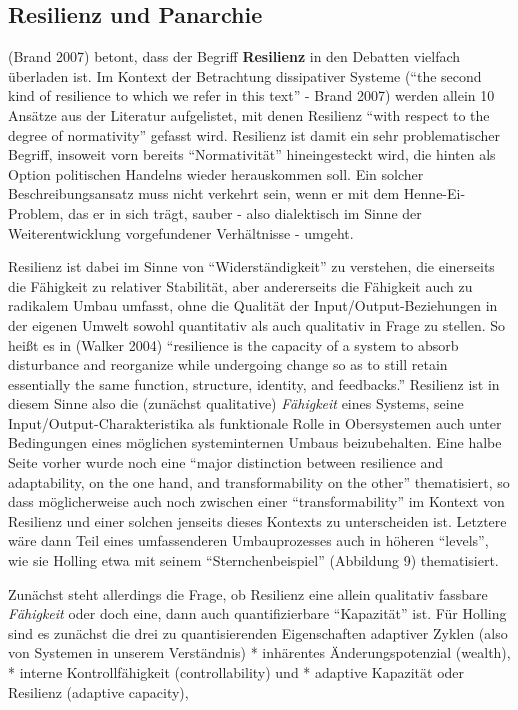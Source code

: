 \documentclass[11pt,a4paper]{article}
\begin{document}
\hypertarget{resilienz-und-panarchie}{%
\subsection{Resilienz und Panarchie}\label{resilienz-und-panarchie}}

(Brand 2007) betont, dass der Begriff \textbf{Resilienz} in den Debatten
vielfach überladen ist. Im Kontext der Betrachtung dissipativer Systeme
(``the second kind of resilience to which we refer in this text'' -
Brand 2007) werden allein 10 Ansätze aus der Literatur aufgelistet, mit
denen Resilienz ``with respect to the degree of normativity'' gefasst
wird. Resilienz ist damit ein sehr problematischer Begriff, insoweit
vorn bereits ``Normativität'' hineingesteckt wird, die hinten als Option
politischen Handelns wieder herauskommen soll. Ein solcher
Beschreibungsansatz muss nicht verkehrt sein, wenn er mit dem
Henne-Ei-Problem, das er in sich trägt, sauber - also dialektisch im
Sinne der Weiterentwicklung vorgefundener Verhältnisse - umgeht.

Resilienz ist dabei im Sinne von ``Widerständigkeit'' zu verstehen, die
einerseits die Fähigkeit zu relativer Stabilität, aber andererseits die
Fähigkeit auch zu radikalem Umbau umfasst, ohne die Qualität der
Input/Output-Beziehungen in der eigenen Umwelt sowohl quantitativ als
auch qualitativ in Frage zu stellen. So heißt es in (Walker 2004)
``resilience is the capacity of a system to absorb disturbance and
reorganize while undergoing change so as to still retain essentially the
same function, structure, identity, and feedbacks.'' Resilienz ist in
diesem Sinne also die (zunächst qualitative) \emph{Fähigkeit} eines
Systems, seine Input/Output-Charakteristika als funktionale Rolle in
Obersystemen auch unter Bedingungen eines möglichen systeminternen
Umbaus beizubehalten. Eine halbe Seite vorher wurde noch eine ``major
distinction between resilience and adaptability, on the one hand, and
transformability on the other'' thematisiert, so dass möglicherweise
auch noch zwischen einer ``transformability'' im Kontext von Resilienz
und einer solchen jenseits dieses Kontexts zu unterscheiden ist.
Letztere wäre dann Teil eines umfassenderen Umbauprozesses auch in
höheren ``levels'', wie sie Holling etwa mit seinem
``Sternchenbeispiel'' (Abbildung 9) thematisiert.

Zunächst steht allerdings die Frage, ob Resilienz eine allein qualitativ
fassbare \emph{Fähigkeit} oder doch eine, dann auch quantifizierbare
``Kapazität'' ist. Für Holling sind es zunächst die drei zu
quantisierenden Eigenschaften adaptiver Zyklen (also von Systemen in
unserem Verständnis) * inhärentes Änderungspotenzial (wealth), * interne
Kontrollfähigkeit (controllability) und * adaptive Kapazität oder
Resilienz (adaptive capacity),
\end{document}
